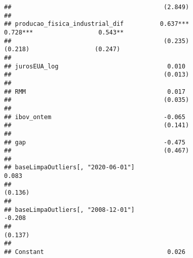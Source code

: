 \documentclass[
]{article}
\begin{document}
\begin{verbatim}
##                                          (2.849)                                                          
##                                                                                                           
## producao_fisica_industrial_dif          0.637***              0.728***                  0.543**           
##                                          (0.235)               (0.218)                  (0.247)           
##                                                                                                           
## jurosEUA_log                              0.010                                                           
##                                          (0.013)                                                          
##                                                                                                           
## RMM                                       0.017                                                           
##                                          (0.035)                                                          
##                                                                                                           
## ibov_ontem                               -0.065                                                           
##                                          (0.141)                                                          
##                                                                                                           
## gap                                      -0.475                                                           
##                                          (0.467)                                                          
##                                                                                                           
## baseLimpaOutliers[, "2020-06-01"]                                                        0.083            
##                                                                                         (0.136)           
##                                                                                                           
## baseLimpaOutliers[, "2008-12-01"]                                                        -0.208           
##                                                                                         (0.137)           
##                                                                                                           
## Constant                                  0.026                                                           

\end{verbatim}
\end{document}

